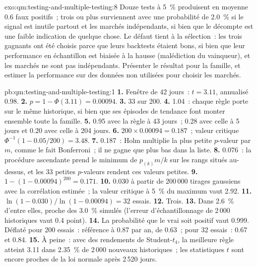 \begin{solution}{exo:qm:testing-and-multiple-testing:8}
Douze tests à 5~\% produisent en moyenne 0.6 faux positifs~; trois ou plus surviennent avec une probabilité de 2.0~\% si le signal est inutile
partout et les marchés indépendants, si bien que le décompte est une faible indication de quelque chose. Le défaut tient à la sélection~: les trois
gagnants ont été choisis parce que leurs backtests étaient bons, si bien que leur performance en échantillon est biaisée à la hausse (malédiction du vainqueur),
et les marchés ne sont pas indépendants. Présenter le résultat pour la famille, et estimer la performance sur des données non utilisées pour choisir les marchés.
\end{solution}

\begin{solution}{pb:qm:testing-and-multiple-testing:1}
\textbf{1.} Fenêtre de 42 jours~: $t = 3.11$,  annualisé 0.98.
\textbf{2.} $p = 1 - \Phi(3.11) = 0.00094$.
\textbf{3.} 33 sur 200.
\textbf{4.} 1.04~: chaque règle porte sur le même historique, si bien que ses épisodes de tendance font monter ensemble toute la famille.
\textbf{5.} 0.95 avec la règle à 43 jours~; 0.28 avec celle à 5 jours et 0.20 avec celle à 204 jours.
\textbf{6.} $200 \times 0.00094 = 0.187$~; valeur critique $\Phi^{-1}(1 - 0.05/200) = 3.48$.
\textbf{7.} 0.187~: Holm multiplie la plus petite $p$-valeur par $m$, comme le fait Bonferroni~; il ne gagne que plus bas dans la liste.
\textbf{8.} 0.076~: la procédure ascendante prend le minimum de $p_{(k)}m/k$ sur les rangs situés au-dessus, et les 33 petites $p$-valeurs rendent ces valeurs petites.
\textbf{9.} $1 - (1 - 0.00094)^{200} = 0.171$.
\textbf{10.} 0.030 à partir de 200\,000 tirages gaussiens avec la corrélation estimée~; la valeur critique à 5~\% du maximum vaut 2.92.
\textbf{11.} $\ln(1 - 0.030)/\ln(1 - 0.00094) = 32$ essais.
\textbf{12.} Trois.
\textbf{13.} Dans 2.6~\% d'entre elles, proche des 3.0~\% simulés (l'erreur d'échantillonnage de 2\,000 historiques vaut 0.4 point).
\textbf{14.} La probabilité que le vrai  soit positif vaut 0.999. Déflaté pour 200 essais~: référence à 0.87 par an,  de 0.63~; pour 32 essais~: 0.67 et 0.84.
\textbf{15.} À peine~: avec des rendements de Student-$t_4$, la meilleure règle atteint 3.11 dans 2.35~\% de 2\,000 nouveaux historiques~; les statistiques $t$ sont
encore proches de la loi normale après 2\,520 jours.

\end{solution}
